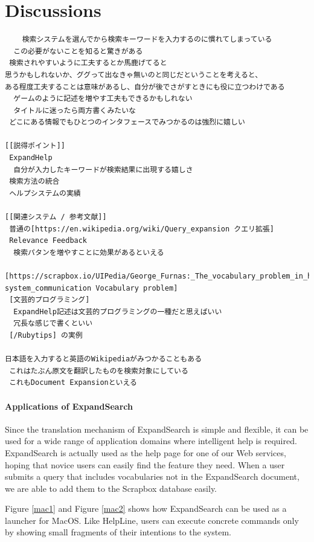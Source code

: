\documentclass[manuscript,anonymous,review]{acmart}
\def\HL{\textsf{HelpLine}}
\def\ES{\textsf{ExpandSearch}}
\def\SB{\textsf{Scrapbox}}
\begin{document}
\section{Discussions}

\begin{verbatim}
    検索システムを選んでから検索キーワードを入力するのに慣れてしまっている
  この必要がないことを知ると驚きがある
 検索されやすいように工夫するとか馬鹿げてると
思うかもしれないか、ググって出なきゃ無いのと同じだということを考えると、
ある程度工夫することは意味があるし、自分が後でさがすときにも役に立つわけである
  ゲームのように記述を増やす工夫もできるかもしれない
  タイトルに迷ったら両方書くみたいな
 どこにある情報でもひとつのインタフェースでみつかるのは強烈に嬉しい

[[説得ポイント]]
 ExpandHelp
  自分が入力したキーワードが検索結果に出現する嬉しさ
 検索方法の統合
 ヘルプシステムの実績

[[関連システム / 参考文献]]
 普通の[https://en.wikipedia.org/wiki/Query_expansion クエリ拡張]
 Relevance Feedback
  検索パタンを増やすことに効果があるといえる
 [https://scrapbox.io/UIPedia/George_Furnas:_The_vocabulary_problem_in_human-system_communication Vocabulary problem]
 [文芸的プログラミング]
  ExpandHelp記述は文芸的プログラミングの一種だと思えばいい
  冗長な感じで書くといい
 [/Rubytips] の実例

日本語を入力すると英語のWikipediaがみつかることもある
 これはたぶん原文を翻訳したものを検索対象にしている
 これもDocument Expansionといえる

\end{verbatim}

\paragraph{Applications of ExpandSearch}

Since the translation mechanism of {\ES} is simple and flexible,
it can be used for a wide range of application domains where
intelligent help is required.
{\ES} is actually used as the help page for
one of our Web services, hoping that
novice users can easily find the feature they need.
When a user submits a query that includes vocabularies
not in the {\ES} document,
we are able to add them to the {\SB} database easily.

Figure \ref{mac1} and Figure \ref{mac2} shows how
{\ES} can be used as a launcher for MacOS.
Like {\HL}, users can execute concrete commands only by
showing small fragments of their intentions to the system.
\end{document}
